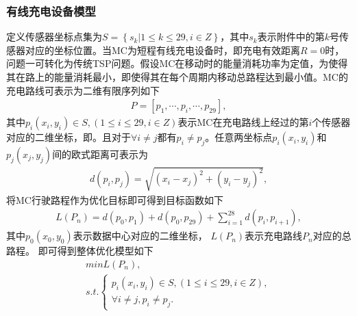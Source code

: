 \documentclass{whutmod}
\begin{document}
			\subsubsection{有线充电设备模型}
		    定义传感器坐标点集为$S=\left \{ s_k| 1\leqslant k \leqslant 29,i\in Z\right \}$，其中$s_k$表示附件中的第$k$号传感器对应的坐标位置。当MC为短程有线充电设备时，即充电有效距离$R=0$时，问题一可转化为传统TSP问题。假设MC在移动时的能量消耗功率为定值，为使得其在路上的能量消耗最小，即使得其在每个周期内移动总路程达到最小值。MC的充电路线可表示为二维有限序列如下
		    \begin{gather}
		    P=[ p_{1},\cdots,p_{i},\cdots,p_{29} ] ,
		    \end{gather}
		     其中$p_{i}(x_i,y_i)\in S,(1\leqslant i \leqslant 29 ,i\in Z)$表示MC在充电路线上经过的第$i$个传感器对应的二维坐标，即。且对于$\forall i \neq j$都有$p_i \neq p_j $。任意两坐标点$p_i(x_i,y_i)$和$p_j(x_j,y_j)$间的欧式距离可表示为
		    \begin{gather*}
		    d(p_i,p_j)=\sqrt{(x_i-x_j)^2+(y_i-y_j)^2},
		    \end{gather*}
		      将MC行驶路程作为优化目标即可得到目标函数如下
		    \begin{gather*}
		    L(P_n)=d(p_0,p_{1})+d(p_0,p_{29})+\sum_{i=1}^{28}d(p_i,p_{i+1}) ,
		    \end{gather*}
		    其中$p_0(x_0,y_0)$表示数据中心对应的二维坐标， $L(P_n)$表示充电路线$P_n$对应的总路程。 即可得到整体优化模型如下 \begin{gather}
		    min L(P_n) ,\\
		    s.t.\left\{\begin{matrix}p_{i}(x_i,y_i)\in S,(1\leqslant i \leqslant 29 ,i\in Z),
		    \\ \forall i \neq j,p_i \neq p_j .
		    \end{matrix}\right.
		    \end{gather}
\end{document}

